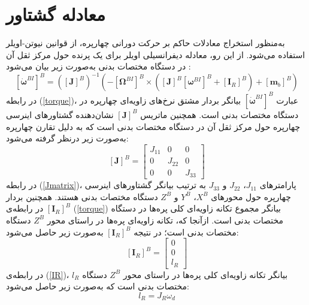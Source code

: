 \section{معادله گشتاور}\label{sec:moment}
به‌منظور استخراج معادلات حاکم بر حرکت دورانی چهارپره، از قوانین نیوتن-اویلر استفاده می‌شود. از این رو،
معادله دیفرانسیلی اویلر برای یک پرنده حول مرکز ثقل آن در دستگاه مختصات بدنی به‌صورت زیر بیان می‌شود \cite{zipfel2000modeling}:
\begin{equation}\label{torque}
	\left[\dot{\boldsymbol{\omega}}^{BI}\right]^B = \left(\left[\boldsymbol J\right]^B\right)^{-1}
	\left(-\left[\boldsymbol \Omega^{BI}\right]^B\times\left(
	\left[\boldsymbol J\right]^B\left[\boldsymbol \omega^{BI}\right]^B+
	\left[\boldsymbol I_R\right]^B
	\right)+ \left[\boldsymbol m_b\right]^B\right)
\end{equation}
در رابطه
(\ref{torque})، عبارت 
$\left[\dot{\boldsymbol\omega}^{BI}\right]^B$
بیانگر بردار مشتق نرخ‌های زاویه‌ای چهارپره در دستگاه مختصات بدنی است. همچنین ماتریس 
$\left[\boldsymbol J\right]^B$
نشان‌دهنده گشتاورهای اینرسی چهارپره حول مرکز ثقل آن در دستگاه مختصات بدنی است که به دلیل تقارن چهارپره به‌صورت زیر درنظر گرفته
 می‌شود:
 \begin{equation}\label{Jmatrix}
 	\left[\boldsymbol J\right]^B = \begin{bmatrix}
 		J_{11} & 0 &0\\
 		0 & J_{22} & 0\\
 		0 & 0 & J_{33}
 	\end{bmatrix}
 \end{equation}
در رابطه 
(\ref{Jmatrix})، پارامترهای 
$J_{11}$،
$J_{22}$
و 
$J_{33}$
به ترتیب بیانگر گشتاور‌های اینرسی چهارپره حول محورهای 
$X^B$،
$Y^B$
و 
$Z^B$
دستگاه مختصات بدنی هستند. همچنین بردار 
$\left[\boldsymbol I_R\right]^B$
در رابطه‌ی 
(\ref{torque})
بیانگر مجموع تكانه زاویه‌ای کلی پره‌ها در دستگاه مختصات بدنی است. ازآنجا که، تكانه زاویه‌ای پره‌ها در راستای محور
$Z^B$
دستگاه مختصات بدنی است؛ در نتیجه 
$\left[\boldsymbol I_R\right]^B$
به‌صورت زیر حاصل می‌شود:
\begin{equation}\label{IR}
	\left[\boldsymbol I_R\right]^B = 
	\begin{bmatrix}
		0\\0\\l_R
	\end{bmatrix}
\end{equation}
در رابطه‌ی 
(\ref{IR})، 
$l_R$
بیانگر تكانه زاویه‌ای کلی پره‌ها در راستای محور
$Z^B$
دستگاه مختصات بدنی است که به‌صورت زیر حاصل می‌شود:
\begin{equation}\label{IRomega}
	l_R = J_R\omega_d
\end{equation}
